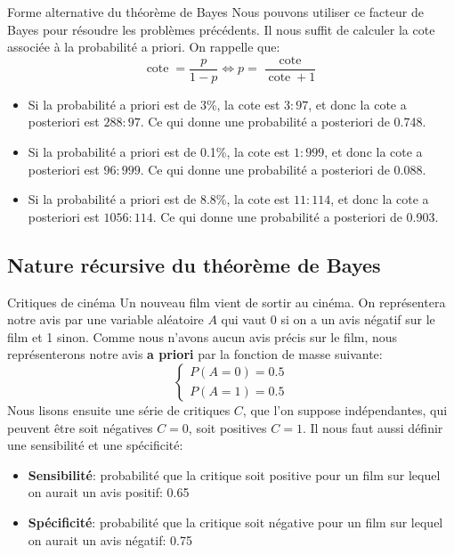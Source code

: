 \documentclass[10pt]{beamer}  %
\newcommand{\cote}{\operatorname{cote}}
\begin{document}
\begin{frame}{Forme alternative du théorème de Bayes}
	Nous pouvons utiliser ce facteur de Bayes pour résoudre les problèmes précédents. Il nous suffit de calculer la cote associée à la probabilité a priori. On rappelle que:
	\begin{equation}
		\cote = \frac{p}{1 - p}  \Longleftrightarrow p = \frac{\cote}{\cote + 1}
		\nonumber
	\end{equation}
	\begin{itemize}
		\item Si la probabilité a priori est de 3\%, la cote est $3:97$, et donc la cote a posteriori est $288:97$. Ce qui donne une probabilité a posteriori de 0.748.
		\item Si la probabilité a priori est de 0.1\%, la cote est $1:999$, et donc la cote a posteriori est $96:999$. Ce qui donne une probabilité a posteriori de 0.088.
		\item Si la probabilité a priori est de 8.8\%, la cote est $11:114$, et donc la cote a posteriori est $1056:114$. Ce qui donne une probabilité a posteriori de 0.903.
	\end{itemize}
\end{frame}

\subsection{Nature récursive du théorème de Bayes}

\begin{frame}{Critiques de cinéma}
	Un nouveau film vient de sortir au cinéma. On représentera notre avis par une variable aléatoire $A$ qui vaut 0 si on a un avis négatif sur le film et 1 sinon. Comme nous n'avons aucun avis précis sur le film, nous représenterons notre avis \textbf{a priori} par la fonction de masse suivante:
	\begin{equation}
		\begin{cases}
			P(A = 0) = 0.5 \\
			P(A = 1) = 0.5
		\end{cases}
		\nonumber
	\end{equation}
	\pause
	Nous lisons ensuite une série de critiques $C$, que l'on suppose indépendantes, qui peuvent être soit négatives $C=0$, soit positives $C=1$. Il nous faut aussi définir une sensibilité et une spécificité:
	\begin{itemize}
		\item \textbf{Sensibilité}: probabilité que la critique soit positive pour un film sur lequel on aurait un avis positif: 0.65
		\item \textbf{Spécificité}: probabilité que la critique soit négative pour un film sur lequel on aurait un avis négatif: 0.75
	\end{itemize}
\end{frame}
\end{document}
